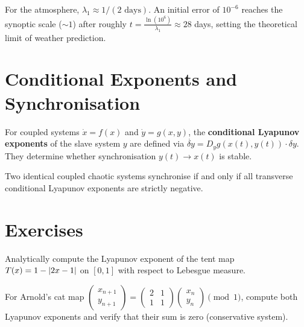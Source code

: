 \begin{example}
For the atmosphere, $\lambda_1 \approx 1/(2\text{ days})$. An initial error
of $10^{-6}$ reaches the synoptic scale ($\sim 1$) after roughly
$t = \frac{\ln(10^6)}{\lambda_1} \approx 28$ days, setting the theoretical
limit of weather prediction.
\end{example}

\section{Conditional Exponents and Synchronisation}

\begin{definition}
For coupled systems $\dot{x} = f(x)$ and $\dot{y} = g(x, y)$, the
\textbf{conditional Lyapunov exponents} of the slave system $y$ are defined
via $\dot{\delta y} = D_y g(x(t), y(t))\cdot\delta y$. They determine whether
synchronisation $y(t) \to x(t)$ is stable.
\end{definition}

\begin{theorem}
Two identical coupled chaotic systems synchronise if and only if all
transverse conditional Lyapunov exponents are strictly negative.
\end{theorem}

\section{Exercises}

\begin{exercise}
Analytically compute the Lyapunov exponent of the tent map
$T(x) = 1 - \left| 2x - 1 \right|$ on $[0,1]$ with respect to Lebesgue measure.
\end{exercise}

\begin{exercise}
For Arnold's cat map
$\begin{pmatrix} x_{n+1} \\ y_{n+1} \end{pmatrix}
= \begin{pmatrix} 2 & 1 \\ 1 & 1 \end{pmatrix}
\begin{pmatrix} x_n \\ y_n \end{pmatrix} \pmod{1}$,
compute both Lyapunov exponents and verify that their sum is zero
(conservative system).
\end{exercise}

